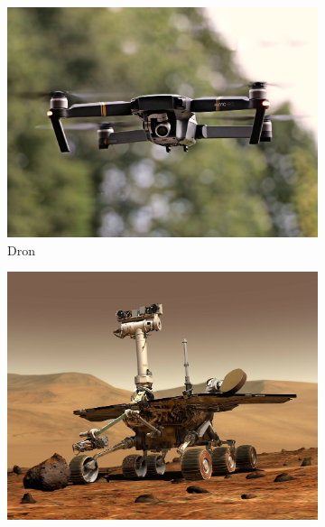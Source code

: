 \begin{figure}[H]
  \begin{subfigure}[b]{0.3\textwidth}
    \includegraphics[width=\textwidth, height=\textwidth]{chapters/images/drone.jpeg}
    \caption{Dron}
    \label{fig:f1}
  \end{subfigure}
  \hfill
  \begin{subfigure}[b]{0.3\textwidth}
    \includegraphics[width=\textwidth, height=\textwidth]{chapters/images/mars.jpg}

\end{subfigure}
\end{figure}

